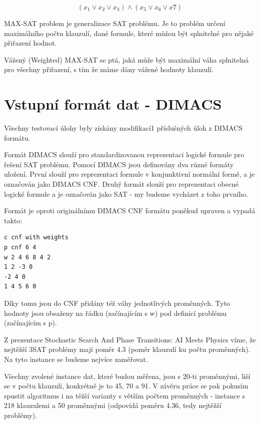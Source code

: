 \documentclass[a4paper,10pt,twocolumn]{article}
\begin{document}
$$
(x_1\lor x_2\lor x_3)\land (x_5\lor x_6\lor x7)
$$


MAX-SAT problem je generalizace SAT problému. Je to problém určení maximálního počtu klauzulí, dané formule, které můžou být splnitelné pro nějaké přiřazení hodnot.

Vážený (Weighted) MAX-SAT se ptá, jaká může být maximální váha splnitelná pro všechny přiřazení, s tím že máme dány vážené hodnoty klauzulí.

\section{Vstupní formát dat - DIMACS}

Všechny testovací úlohy byly získány modifikací1 příslušných úloh z DIMACS formátu. 

Formát DIMACS slouží pro standardizovanou reprezentaci logické formule pro řešení SAT problému. Pomocí DIMACS  jsou definovány dva různé formáty uložení. První slouží pro reprezentaci  formule v konjunktivní normální formě, a je označován jako DIMACS CNF. Druhý  formát  slouží  pro  reprezentaci  obecné  logické  formule a je označován jako SAT - my budeme vycházet z toho prvního.

Formát je oproti originálnímu DIMACS CNF formátu poněkud upraven a vypadá takto:
   \begin{verbatim}
c cnf with weights
p cnf 6 4
w 2 4 6 8 4 2
1 2 -3 0
-2 4 0
1 4 5 6 0
   \end{verbatim}

Díky tomu jsou do CNF přidány též váhy jednotlivých proměnných. Tyto hodnoty jsou obsaženy na řádku (začínajícím s w) pod definicí problému (začínajícím s p).


Z prezentace Stochastic Search And Phase Transitions: AI Meets Physics víme, že nejtěžší  3SAT problémy mají poměr 4.3 (poměr klauzulí ku počtu proměnných). Na tyto instance se budeme nejvíce zaměřovat.


Všechny zvolené instance dat, které budou měřena, jsou s 20-ti proměnnými, liší se v počtu klauzulí, konkrétně je to 45, 70 a 91. V závěru práce se pak pokusím spustit algoritmus i na těžší varianty s větším počtem proměnných - instance s 218 klauzulemi a 50 proměnnými (odpovídá poměru 4.36, tedy nejtěžší problémy).


\end{document}
